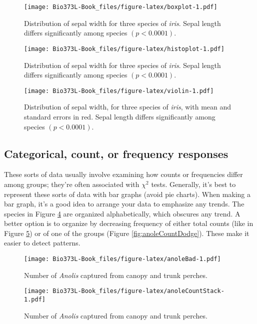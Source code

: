 \documentclass[]{book}
\begin{document}
\begin{figure}
\centering
\texttt{[image: Bio373L-Book\_files/figure-latex/boxplot-1.pdf]}
\caption{\label{fig:boxplot}Distribution of sepal width for three species of
\emph{iris}. Sepal length differs significantly among species
\((p < 0.0001)\).}
\end{figure}

\begin{figure}
\centering
\texttt{[image: Bio373L-Book\_files/figure-latex/histoplot-1.pdf]}
\caption{\label{fig:histoplot}Distribution of sepal width for three species of
\emph{iris}. Sepal length differs significantly among species
\((p < 0.0001)\).}
\end{figure}

\begin{figure}
\centering
\texttt{[image: Bio373L-Book\_files/figure-latex/violin-1.pdf]}
\caption{\label{fig:violin}Distribution of sepal width, for three species of
\emph{iris}, with mean and standard errors in red. Sepal length differs
significantly among species \((p < 0.0001)\).}
\end{figure}

\subsection{Categorical, count, or frequency
responses}\label{categorical-count-or-frequency-responses}

These sorts of data usually involve examining how counts or frequencies
differ among groups; they're often associated with \(\chi^2\) tests.
Generally, it's best to represent these sorts of data with bar graphs
(avoid pie charts). When making a bar graph, it's a good idea to arrange
your data to emphasize any trends. The species in Figure
\ref{fig:anoleBad} are organized alphabetically, which obscures any
trend. A better option is to organize by decreasing frequency of either
total counts (like in Figure \ref{fig:anoleCountStack}) or of one of the
groups (Figure \ref{fig:anoleCountDodge}). These make it easier to
detect patterns.




\begin{figure}
\centering
\texttt{[image: Bio373L-Book\_files/figure-latex/anoleBad-1.pdf]}
\caption{\label{fig:anoleBad}Number of \emph{Anolis} captured from canopy and
trunk perches.}
\end{figure}

\begin{figure}
\centering
\texttt{[image: Bio373L-Book\_files/figure-latex/anoleCountStack-1.pdf]}
\caption{\label{fig:anoleCountStack}Number of \emph{Anolis} captured from canopy and
trunk perches.}
\end{figure}
\end{document}
